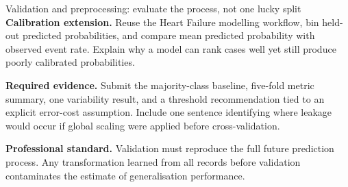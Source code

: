 \begin{labproject}{Validation and preprocessing: evaluate the process, not one lucky split}
\textbf{Calibration extension.} Reuse the Heart Failure modelling workflow, bin held-out predicted probabilities, and compare mean predicted probability with observed event rate. Explain why a model can rank cases well yet still produce poorly calibrated probabilities.

\tcbbreak

\begin{verification}
\textbf{Required evidence.} Submit the majority-class baseline, five-fold metric summary, one variability result, and a threshold recommendation tied to an explicit error-cost assumption. Include one sentence identifying where leakage would occur if global scaling were applied before cross-validation.

\textbf{Professional standard.} Validation must reproduce the full future prediction process. Any transformation learned from all records before validation contaminates the estimate of generalisation performance.
\end{verification}
\end{labproject}
